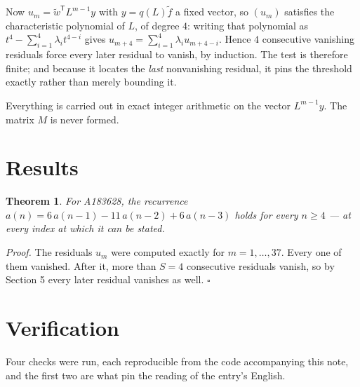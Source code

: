\documentclass[11pt]{article}
\newtheorem{theorem}{Theorem}
\theoremstyle{definition}
\begin{document}
Now $u_m = \tilde w^{\mathsf T} L^{m-1} y$ with $y = q(L)\tilde f$ a fixed vector, so $(u_m)$ satisfies the characteristic polynomial of $L$, of degree $4$: writing that polynomial as $t^{4} - \sum_{i=1}^{4} \lambda_i t^{4-i}$ gives $u_{m+4} = \sum_{i=1}^{4} \lambda_i u_{m+4-i}$. Hence $4$ consecutive vanishing residuals force every later residual to vanish, by induction. The test is therefore finite; and because it locates the {\itshape last} nonvanishing residual, it pins the threshold exactly rather than merely bounding it.

Everything is carried out in exact integer arithmetic on the vector $L^{m-1}y$. The matrix $M$ is never formed.

\section{Results}

\begin{theorem} For A183628, the recurrence $a(n) = 6\,a(n-1) - 11\,a(n-2) + 6\,a(n-3)$ holds for every $n \ge 4$ --- at every index at which it can be stated.\end{theorem}

{\itshape Proof.} The residuals $u_m$ were computed exactly for $m = 1,\dots,37$. Every one of them vanished. After it, more than $S = 4$ consecutive residuals vanish, so by Section 5 every later residual vanishes as well. $\square$

\section{Verification}

Four checks were run, each reproducible from the code accompanying this note, and the first two are what pin the reading of the entry's English.
\end{document}
